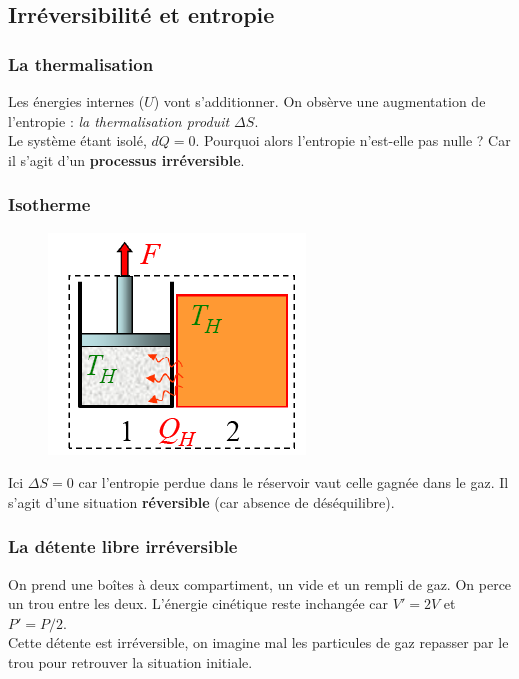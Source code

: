 \documentclass	[11pt, a4paper, openany]{book}
\begin{document}
\subsection{Irréversibilité et entropie}
\subsubsection{La thermalisation}
Les énergies internes ($U$) vont s'additionner. On obsèrve une augmentation de l'entropie : \textit{la thermalisation produit $\Delta S$}.\\
Le système étant isolé, $dQ = 0$. Pourquoi alors l'entropie n'est-elle pas nulle ? Car il s'agit d'un \textbf{processus irréversible}.
\newpage
\subsubsection{Isotherme}
\begin{figure}
	\includegraphics[scale=0.44]{th/image20.png}
\end{figure}
Ici $\Delta S = 0$ car l'entropie perdue dans le réservoir vaut celle gagnée dans le gaz. Il s'agit d'une situation \textbf{réversible} (car absence de déséquilibre).

\subsubsection{La détente libre irréversible}
On prend une boîtes à deux compartiment, un vide et un rempli de gaz. On perce un trou entre les deux. L'énergie cinétique reste inchangée car $V' = 2V$ et $P' = P/2$. \\
Cette détente est irréversible, on imagine mal les particules de gaz repasser par le trou pour retrouver la situation initiale.\\
\end{document}
